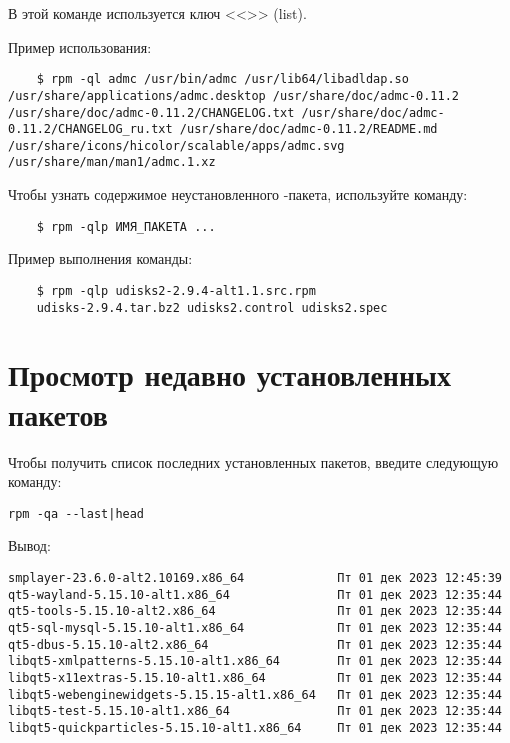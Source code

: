 В этой команде используется ключ <<>> (list).


Пример использования:
\begin{verbatim}
	$ rpm -ql admc /usr/bin/admc /usr/lib64/libadldap.so /usr/share/applications/admc.desktop /usr/share/doc/admc-0.11.2 /usr/share/doc/admc-0.11.2/CHANGELOG.txt /usr/share/doc/admc-0.11.2/CHANGELOG_ru.txt /usr/share/doc/admc-0.11.2/README.md /usr/share/icons/hicolor/scalable/apps/admc.svg /usr/share/man/man1/admc.1.xz
\end{verbatim}

Чтобы узнать содержимое неустановленного -пакета, используйте команду:
\begin{verbatim}
	$ rpm -qlp ИМЯ_ПАКЕТА ...
\end{verbatim}

Пример выполнения команды:
\begin{verbatim}
	$ rpm -qlp udisks2-2.9.4-alt1.1.src.rpm
	udisks-2.9.4.tar.bz2 udisks2.control udisks2.spec 
\end{verbatim}

\section{Просмотр недавно установленных пакетов}\label{view-recently-installed-packages}
Чтобы получить список последних установленных пакетов, введите следующую команду: 

\begin{verbatim}
rpm -qa --last|head	
\end{verbatim}

Вывод:
\begin{verbatim}
smplayer-23.6.0-alt2.10169.x86_64             Пт 01 дек 2023 12:45:39
qt5-wayland-5.15.10-alt1.x86_64               Пт 01 дек 2023 12:35:44
qt5-tools-5.15.10-alt2.x86_64                 Пт 01 дек 2023 12:35:44
qt5-sql-mysql-5.15.10-alt1.x86_64             Пт 01 дек 2023 12:35:44
qt5-dbus-5.15.10-alt2.x86_64                  Пт 01 дек 2023 12:35:44
libqt5-xmlpatterns-5.15.10-alt1.x86_64        Пт 01 дек 2023 12:35:44
libqt5-x11extras-5.15.10-alt1.x86_64          Пт 01 дек 2023 12:35:44
libqt5-webenginewidgets-5.15.15-alt1.x86_64   Пт 01 дек 2023 12:35:44
libqt5-test-5.15.10-alt1.x86_64               Пт 01 дек 2023 12:35:44
libqt5-quickparticles-5.15.10-alt1.x86_64     Пт 01 дек 2023 12:35:44
\end{verbatim}

